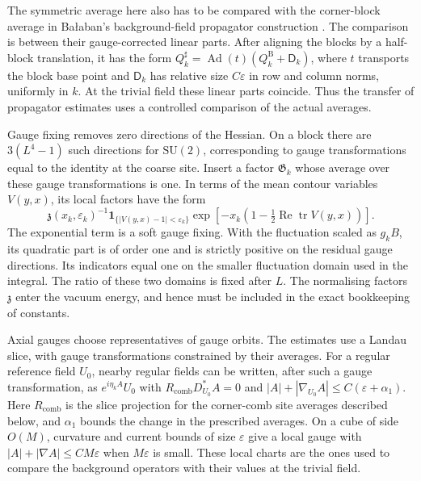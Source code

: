 \documentclass[11pt,letterpaper,reqno]{amsart}
\theoremstyle{definition}
\theoremstyle{remark}
\newcommand{\SU}{\mathrm{SU}}
\newcommand{\tr}{\operatorname{tr}}
\begin{document}
The symmetric average here also has to be compared with the
corner-block average in Ba\l aban's background-field propagator
construction \cite{Balaban1985}.
The comparison is between their gauge-corrected linear parts.
After aligning the blocks by a half-block translation, it has the
form
$Q_k^\sharp=\operatorname{Ad}(t)(Q_k^{\mathrm B}+\mathsf D_k)$,
where $t$ transports the block base point and $\mathsf D_k$ has
relative size $C\varepsilon$ in row and column norms, uniformly
in $k$. At the trivial field these linear parts coincide.
Thus the transfer of propagator estimates uses a controlled
comparison of the actual averages.

Gauge fixing removes zero directions of the Hessian. On a block there
are $3(L^4-1)$ such directions for $\SU(2)$, corresponding to gauge
transformations equal to the identity at the coarse site.
Insert a factor $\mathfrak G_k$ whose average over these gauge
transformations is one. In terms of the mean contour variables
$V(y,x)$, its local factors have the form
\[
 \mathfrak z(x_k,\varepsilon_k)^{-1}
 \mathbf1_{\{|V(y,x)-1|<\varepsilon_k\}}
 \exp\!\left[-x_k\left(1-\tfrac12
                  \operatorname{Re}\tr V(y,x)\right)\right].
\]
The exponential term is a soft gauge fixing. With the fluctuation
scaled as $g_kB$, its quadratic part is of order one and is strictly
positive on the residual gauge directions. Its indicators equal one
on the smaller fluctuation domain used in the integral. The ratio of
these two domains is fixed after $L$. The normalising factors
$\mathfrak z$ enter the vacuum energy, and hence must be included in
the exact bookkeeping of constants.

Axial gauges choose representatives of gauge orbits. The estimates use
a Landau slice, with gauge transformations constrained by their
averages. For a regular reference field $U_0$, nearby regular fields
can be written, after such a gauge transformation, as
$e^{i\eta_kA}U_0$ with
$R_{\mathrm{comb}}D_{U_0}^*A=0$ and
$|A|+|\nabla_{U_0}A|\le C(\varepsilon+\alpha_1)$.
Here $R_{\mathrm{comb}}$ is the slice projection for the corner-comb
site averages described below, and
$\alpha_1$ bounds the change in the prescribed averages. On a cube of
side $O(M)$, curvature and current bounds of size $\varepsilon$ give
a local gauge with
$|A|+|\nabla A|\le CM\varepsilon$ when $M\varepsilon$ is small.
These local charts are the ones used to compare the background
operators with their values at the trivial field.
\end{document}
